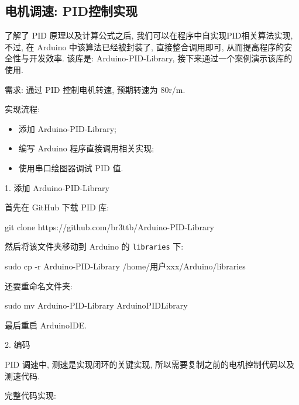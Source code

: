 \documentclass[openany, fontset=windowsold]{ctexbook}
\theoremstyle{kaiti}
\theoremstyle{normal}
\begin{document}
\subsection{电机调速: PID控制实现}

了解了 PID 原理以及计算公式之后, 我们可以在程序中自实现PID相关算法实现, 不过, 在 Arduino 中该算法已经被封装了, 直接整合调用即可, 从而提高程序的安全性与开发效率. 该库是: Arduino-PID-Library, 接下来通过一个案例演示该库的使用.

需求: 通过 PID 控制电机转速, 预期转速为 80r/m.

实现流程:

\begin{itemize}
  \item 添加 Arduino-PID-Library; 
  \item 编写 Arduino 程序直接调用相关实现; 
  \item 使用串口绘图器调试 PID 值.
\end{itemize}

1. 添加 Arduino-PID-Library

首先在 GitHub 下载 PID 库: 

\begin{bash}
  git clone https://github.com/br3ttb/Arduino-PID-Library
\end{bash}

然后将该文件夹移动到 Arduino 的 \verb|libraries| 下: 

\begin{bash}
  sudo cp -r Arduino-PID-Library /home/用户xxx/Arduino/libraries
\end{bash}

还要重命名文件夹: 

\begin{bash}
  sudo mv Arduino-PID-Library ArduinoPIDLibrary
\end{bash}

最后重启 ArduinoIDE.

2. 编码

PID 调速中, 测速是实现闭环的关键实现, 所以需要复制之前的电机控制代码以及测速代码.

完整代码实现:
\end{document}
